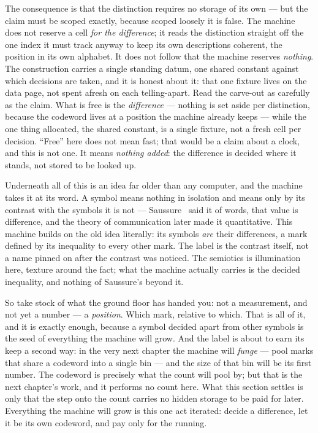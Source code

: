 The consequence is that the distinction requires no storage of its own --- but the claim must be scoped exactly,
because scoped loosely it is false. The machine does not reserve a cell \emph{for the difference}; it reads the
distinction straight off the one index it must track anyway to keep its own descriptions coherent, the position in its
own alphabet. It does not follow that the machine reserves \emph{nothing}. The construction carries a single standing
datum, one shared constant against which decisions are taken, and it is honest about it: that one fixture lives on the
data page, not spent afresh on each telling-apart. Read the carve-out as carefully as the claim. What is free is the
\emph{difference} --- nothing is set aside per distinction, because the codeword lives at a position the machine
already keeps --- while the one thing allocated, the shared constant, is a single fixture, not a fresh cell per
decision. ``Free'' here does not mean fast; that would be a claim about a clock, and this is not one. It means
\emph{nothing added}: the difference is decided where it stands, not stored to be looked up.

Underneath all of this is an idea far older than any computer, and the machine takes it at its word. A symbol means
nothing in isolation and means only by its contrast with the symbols it is not --- Saussure~\cite{saussure1916} said it
of words, that value is difference, and the theory of communication later made it quantitative. This machine builds on
the old idea literally: its symbols \emph{are} their differences, a mark defined by its inequality to every other mark.
The label is the contrast itself, not a name pinned on after the contrast was noticed. The semiotics is illumination
here, texture around the fact; what the machine actually carries is the decided inequality, and nothing of Saussure's
beyond it.

So take stock of what the ground floor has handed you: not a measurement, and not yet a number --- a \emph{position}.
Which mark, relative to which. That is all of it, and it is exactly enough, because a symbol decided apart from other
symbols is the seed of everything the machine will grow. And the label is about to earn its keep a second way: in the
very next chapter the machine will \emph{funge} --- pool marks that share a codeword into a single bin --- and the size
of that bin will be its first number. The codeword is precisely what the count will pool by; but that is the next
chapter's work, and it performs no count here. What this section settles is only that the step onto the count carries
no hidden storage to be paid for later. Everything the machine will grow is this one act iterated: decide a difference,
let it be its own codeword, and pay only for the running.

